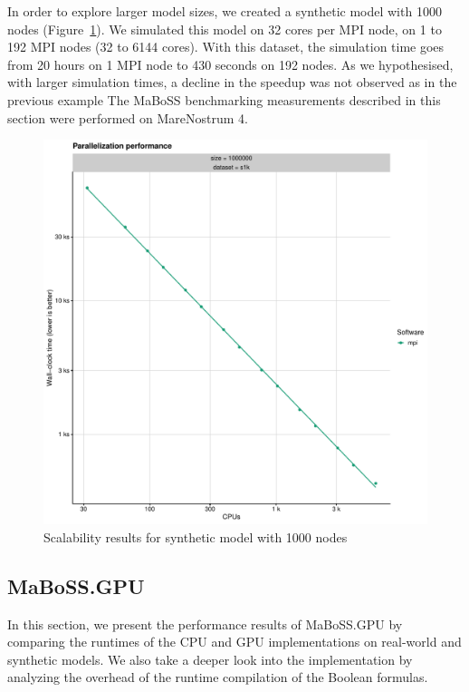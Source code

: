 \documentclass[times, twoside]{zHenriquesLab-StyleBioRxiv}
\begin{document}
In order to explore larger model sizes, we created a synthetic model with 1000 nodes (Figure~\ref{fig:synthetic_results}). We simulated this model on 32 cores per MPI node, on 1 to 192 MPI nodes (32 to 6144 cores). With this dataset, the simulation time goes from 20 hours on 1 MPI node to 430 seconds on 192 nodes. As we hypothesised, with larger simulation times, a decline in the speedup was not observed as in the previous example 
The MaBoSS benchmarking measurements described in this section were performed on MareNostrum 4.

\begin{figure}%
\centering
\includegraphics[width=.8\linewidth]{Figures/large_model.pdf}
\caption{Scalability results for synthetic model with 1000 nodes}
\label{fig:synthetic_results}
\end{figure}


\subsection*{MaBoSS.GPU}

In this section, we present the performance results of MaBoSS.GPU by comparing the runtimes of the CPU and GPU implementations on real-world and synthetic models. We also take a deeper look into the implementation by analyzing the overhead of the runtime compilation of the Boolean formulas. 
\end{document}
